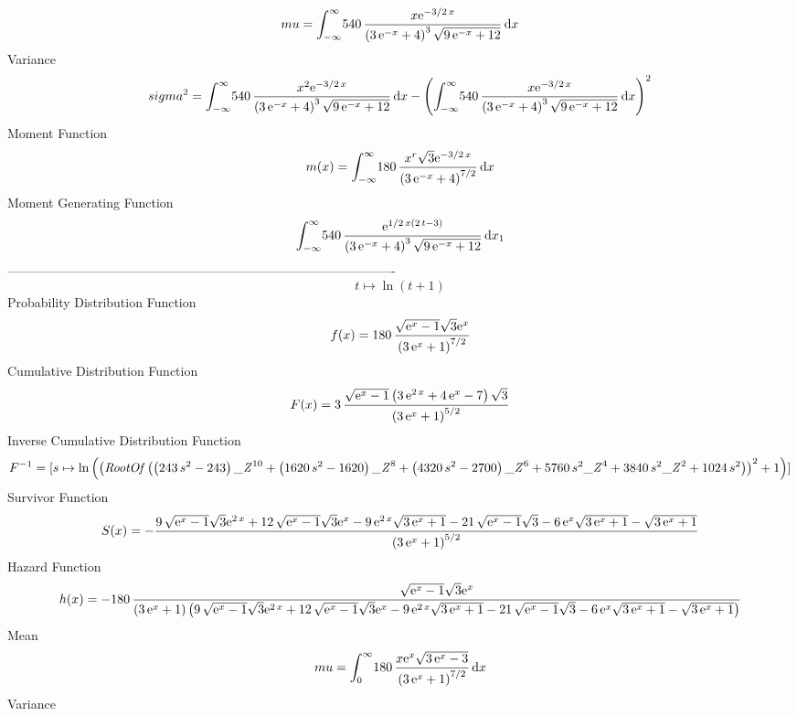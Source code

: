 \documentclass[12pt]{article}
\begin{document}
 $$ mu=\int_{-\infty }^{\infty }\!540\,{\frac {x{{\rm e}^{-3/2\,x}}}{ \left( 
3\,{{\rm e}^{-x}}+4 \right) ^{3}\sqrt {9\,{{\rm e}^{-x}}+12}}}
\,{\rm d}x
$$ Variance 
 $$ sigma^2 = \int_{-\infty }^{\infty }\!540\,{\frac {{x}^{2}{{\rm e}^{-3/2\,x}}}{
 \left( 3\,{{\rm e}^{-x}}+4 \right) ^{3}\sqrt {9\,{{\rm e}^{-x}}+12}}}
\,{\rm d}x- \left( \int_{-\infty }^{\infty }\!540\,{\frac {x{{\rm e}^{
-3/2\,x}}}{ \left( 3\,{{\rm e}^{-x}}+4 \right) ^{3}\sqrt {9\,{{\rm e}^
{-x}}+12}}}\,{\rm d}x \right) ^{2}
$$Moment Function 
 $$ m(x) = \int_{-\infty }^{\infty }\!180\,{\frac {{x}^{r}\sqrt {3}{{\rm e}^{-3/2
\,x}}}{ \left( 3\,{{\rm e}^{-x}}+4 \right) ^{7/2}}}\,{\rm d}x
$$ Moment Generating Function 
 $$\int_{-\infty }^{\infty }\!540\,{\frac {{{\rm e}^{1/2\,x \left( 2\,t-3
 \right) }}}{ \left( 3\,{{\rm e}^{-x}}+4 \right) ^{3}\sqrt {9\,{
{\rm e}^{-x}}+12}}}\,{\rm d}x_{{1}}
$$-------------------------------------------------------------------------------------------  \\$$t\mapsto \ln  \left( t+1 \right) 
$$Probability Distribution Function 
$$  f(x)=180\,{\frac {\sqrt {{{\rm e}^{x}}-1}\sqrt {3}{{\rm e}^{x}}}{ \left( 3
\,{{\rm e}^{x}}+1 \right) ^{7/2}}}
$$Cumulative Distribution Function  
 $$F(x)=3\,{\frac {\sqrt {{{\rm e}^{x}}-1} \left( 3\,{{\rm e}^{2\,x}}+4\,{
{\rm e}^{x}}-7 \right) \sqrt {3}}{ \left( 3\,{{\rm e}^{x}}+1 \right) ^
{5/2}}}
$$ Inverse Cumulative Distribution Function 
  $$F^{-1} = [s\mapsto \ln  \left(  \left( {\it RootOf} \left(  \left( 243\,{s}^{2}
-243 \right) {{\it \_Z}}^{10}+ \left( 1620\,{s}^{2}-1620 \right) {{
\it \_Z}}^{8}+ \left( 4320\,{s}^{2}-2700 \right) {{\it \_Z}}^{6}+5760
\,{s}^{2}{{\it \_Z}}^{4}+3840\,{s}^{2}{{\it \_Z}}^{2}+1024\,{s}^{2}
 \right)  \right) ^{2}+1 \right) ]
$$Survivor Function 
 $$ S(x)=-{\frac {9\,\sqrt {{{\rm e}^{x}}-1}\sqrt {3}{{\rm e}^{2\,x}}+12\,
\sqrt {{{\rm e}^{x}}-1}\sqrt {3}{{\rm e}^{x}}-9\,{{\rm e}^{2\,x}}
\sqrt {3\,{{\rm e}^{x}}+1}-21\,\sqrt {{{\rm e}^{x}}-1}\sqrt {3}-6\,{
{\rm e}^{x}}\sqrt {3\,{{\rm e}^{x}}+1}-\sqrt {3\,{{\rm e}^{x}}+1}}{
 \left( 3\,{{\rm e}^{x}}+1 \right) ^{5/2}}}
$$ Hazard Function 
 $$ h(x)=-180\,{\frac {\sqrt {{{\rm e}^{x}}-1}\sqrt {3}{{\rm e}^{x}}}{ \left( 3
\,{{\rm e}^{x}}+1 \right)  \left( 9\,\sqrt {{{\rm e}^{x}}-1}\sqrt {3}{
{\rm e}^{2\,x}}+12\,\sqrt {{{\rm e}^{x}}-1}\sqrt {3}{{\rm e}^{x}}-9\,{
{\rm e}^{2\,x}}\sqrt {3\,{{\rm e}^{x}}+1}-21\,\sqrt {{{\rm e}^{x}}-1}
\sqrt {3}-6\,{{\rm e}^{x}}\sqrt {3\,{{\rm e}^{x}}+1}-\sqrt {3\,{
{\rm e}^{x}}+1} \right) }}
$$Mean 
 $$ mu=\int_{0}^{\infty }\!180\,{\frac {x{{\rm e}^{x}}\sqrt {3\,{{\rm e}^{x}}
-3}}{ \left( 3\,{{\rm e}^{x}}+1 \right) ^{7/2}}}\,{\rm d}x
$$ Variance 
\end{document}

